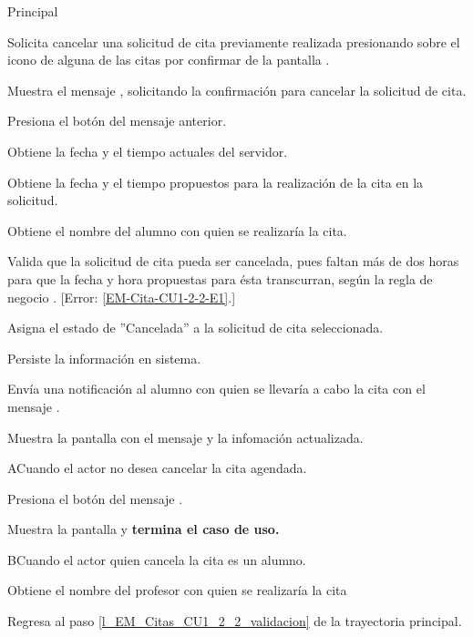 \begin{UCtrayectoria}{Principal}

	\UCpaso [\UCactor] Solicita cancelar una solicitud de cita previamente realizada presionando sobre el icono  de alguna de las citas por confirmar de la pantalla .

	\UCpaso Muestra el mensaje , solicitando la confirmación para cancelar la solicitud de cita. 

	\UCpaso Presiona el botón  del mensaje anterior.  
 
	\UCpaso Obtiene la fecha y el tiempo actuales del servidor.

	\UCpaso Obtiene la fecha y el tiempo propuestos para la realización de la cita en la solicitud.

	\UCpaso Obtiene el nombre del alumno con quien se realizaría la cita. 

	\UCpaso Valida que la solicitud de cita pueda ser cancelada, pues faltan más de dos horas para que la fecha y hora propuestas para ésta transcurran, según la regla de negocio . [Error: \ref{EM-Cita-CU1-2-2-E1}.] \label{l_EM_Citas_CU1_2_2_validacion}

	\UCpaso Asigna el estado de ''Cancelada'' a la solicitud de cita seleccionada. 

	\UCpaso Persiste la información en sistema. 

	\UCpaso Envía una notificación al alumno con quien se llevaría a cabo la cita con el mensaje .

	\UCpaso Muestra la pantalla  con el mensaje  y la infomación actualizada.
	

\end{UCtrayectoria}

\begin{UCtrayectoriaA}{A}{Cuando el actor no desea cancelar la cita agendada.}

	\UCpaso Presiona el botón  del mensaje .

	\UCpaso Muestra la pantalla  y \textbf{termina el caso de uso.}

\end{UCtrayectoriaA}

\begin{UCtrayectoriaA}{B}{Cuando el actor quien cancela la cita es un alumno.}

	\UCpaso Obtiene el nombre del profesor con quien se realizaría la cita

	\UCpaso Regresa al paso \ref{l_EM_Citas_CU1_2_2_validacion} de la trayectoria principal.

\end{UCtrayectoriaA}

